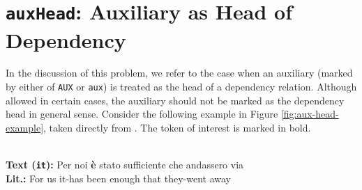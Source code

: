 \section{\texttt{auxHead}: Auxiliary as Head of Dependency}
\label{future:auxHead}

In the discussion of this problem, we refer to the case when an auxiliary (marked by either of \verb|AUX| or \verb|aux|) is treated as the head of a dependency relation. Although allowed in certain cases, the auxiliary should not be marked as the dependency head in general sense. Consider the following example in Figure \ref{fig:aux-head-example}, taken directly from \cite{alzetta2017dangerous}. The token of interest is marked in bold.

\begin{example}
\textbf{ }\\
\textbf{Text (\texttt{it}):} Per noi \textbf{\`e} stato sufficiente che andassero via\\
\textbf{Lit.:} For us it-has been enough that they-went away\\
\end{example}
    
